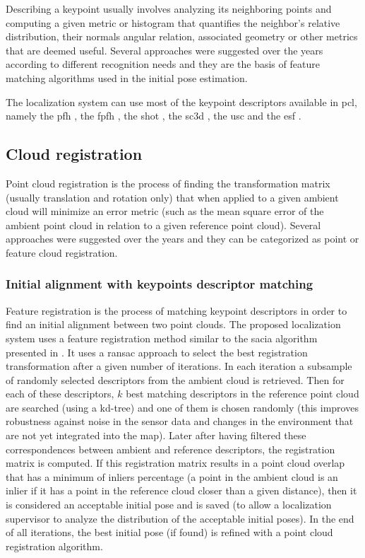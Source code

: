 Describing a keypoint usually involves analyzing its neighboring points and computing a given metric or histogram that quantifies the neighbor's relative distribution, their normals angular relation, associated geometry or other metrics that are deemed useful. Several approaches were suggested over the years according to different recognition needs and they are the basis of feature matching algorithms used in the initial pose estimation.

The localization system can use most of the keypoint descriptors available in \gls{pcl}, namely the \gls{pfh} \cite{Rusu2008a}, the \gls{fpfh} \cite{Rusu2009}, the \gls{shot} \cite{Tombari2011}, the \gls{sc3d} \cite{Frome2004}, the \gls{usc} \cite{Tombari2010} and the \gls{esf} \cite{Wohlkinger2011}.


\subsection{Cloud registration}

Point cloud registration is the process of finding the transformation matrix (usually translation and rotation only) that when applied to a given ambient cloud will minimize an error metric (such as the mean square error of the ambient point cloud in relation to a given reference point cloud). Several approaches were suggested over the years and they can be categorized as point or feature cloud registration.


\subsubsection{Initial alignment with keypoints descriptor matching}\label{subsec:localization-system_feature-registration}

Feature registration is the process of matching keypoint descriptors in order to find an initial alignment between two point clouds. The proposed localization system uses a feature registration method similar to the \gls{sacia} algorithm presented in \cite{Rusu2009}. It uses a \gls{ransac} approach to select the best registration transformation after a given number of iterations. In each iteration a subsample of randomly selected descriptors from the ambient cloud is retrieved. Then for each of these descriptors, $k$ best matching descriptors in the reference point cloud are searched (using a kd-tree) and one of them is chosen randomly (this improves robustness against noise in the sensor data and changes in the environment that are not yet integrated into the map). Later after having filtered these correspondences between ambient and reference descriptors, the registration matrix is computed. If this registration matrix results in a point cloud overlap that has a minimum of inliers percentage (a point in the ambient cloud is an inlier if it has a point in the reference cloud closer than a given distance), then it is considered an acceptable initial pose and is saved (to allow a localization supervisor to analyze the distribution of the acceptable initial poses). In the end of all iterations, the best initial pose (if found) is refined with a point cloud registration algorithm.


